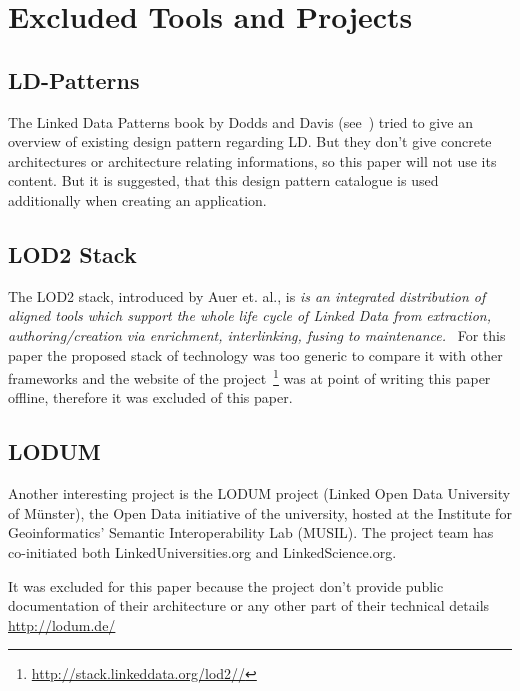 \section{Excluded Tools and Projects}

\subsection{LD-Patterns}
The Linked Data Patterns book by Dodds and Davis (see~\cite{dodds2011linked}) tried to give an overview of existing design pattern regarding LD. But they don't give concrete architectures or architecture relating informations, so this paper will not use its content. But it is suggested, that this design pattern catalogue is used additionally when creating an application.

\subsection{LOD2 Stack}

The LOD2 stack, introduced by Auer et. al., is \emph{is an integrated distribution of aligned tools which support the whole life cycle of Linked Data from extraction, authoring/creation via enrichment, interlinking, fusing to maintenance.}~\cite{auer2012managing} For this paper the proposed stack of technology was too generic to compare it with other frameworks and the website of the project~\footnote{\url{http://stack.linkeddata.org/lod2//}} was at point of writing this paper offline, therefore it was excluded of this paper.

\subsection{LODUM}

Another interesting project is the LODUM project (Linked Open Data University of Münster), the Open Data initiative of the university, hosted at the Institute for Geoinformatics' Semantic Interoperability Lab (MUSIL). The project team has co-initiated both LinkedUniversities.org and LinkedScience.org.

It was excluded for this paper because the project don't provide public documentation of their architecture or any other part of their technical details
\url{http://lodum.de/}